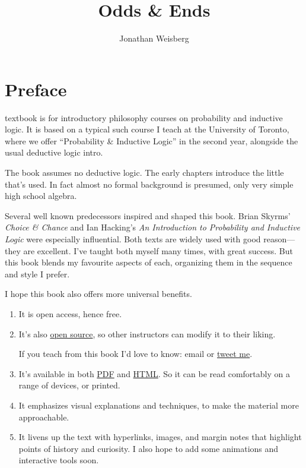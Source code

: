 \documentclass[justified]{tufte-book}
\title{Odds \& Ends}
\author{Jonathan Weisberg}
\date{}
\providecommand{\tightlist}{%
  \setlength{\itemsep}{0pt}\setlength{\parskip}{0pt}}
\theoremstyle{definition}
\theoremstyle{definition}
\theoremstyle{definition}
\theoremstyle{definition}
\theoremstyle{remark}
\begin{document}
\maketitle



{
\setcounter{tocdepth}{0}
\tableofcontents
}

\hypertarget{preface}{%
\chapter*{Preface}\label{preface}}

 textbook is for introductory philosophy courses on probability and inductive logic. It is based on a typical such course I teach at the University of Toronto, where we offer ``Probability \& Inductive Logic'' in the second year, alongside the usual deductive logic intro.\(\,\)

The book assumes no deductive logic. The early chapters introduce the little that's used. In fact almost no formal background is presumed, only very simple high school algebra.

Several well known predecessors inspired and shaped this book. Brian Skyrms' \emph{Choice \& Chance} and Ian Hacking's \emph{An Introduction to Probability and Inductive Logic} were especially influential. Both texts are widely used with good reason---they are excellent. I've taught both myself many times, with great success. But this book blends my favourite aspects of each, organizing them in the sequence and style I prefer.

I hope this book also offers more universal benefits.

\begin{enumerate}
\def\labelenumi{\arabic{enumi}.}
\tightlist
\item
  It is open access, hence free.
\item
  It's also \href{https://github.com/jweisber/vip-source}{open source}, so other instructors can modify it to their liking.

  \begin{marginfigure}
   If you teach from this book I'd love to know: email or
   \href{https://twitter.com/jweisber}{tweet me}.
   \end{marginfigure}
\item
  It's available in both \href{http://jonathanweisberg.org/vip/_main.pdf}{PDF} and \href{http://jonathanweisberg.org/vip/}{HTML}. So it can be read comfortably on a range of devices, or printed.
\item
  It emphasizes visual explanations and techniques, to make the material more approachable.
\item
  It livens up the text with hyperlinks, images, and margin notes that highlight points of history and curiosity. I also hope to add some animations and interactive tools soon.
\end{enumerate}
\end{document}
